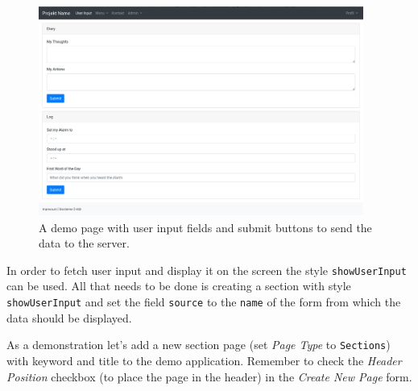 \documentclass[a4paper,oneside]{book}
\begin{document}
\begin{figure}[ht]
    \centering
    \includegraphics[width=0.95\textwidth]{form_empty.png}
    \caption{A demo page with user input fields and submit buttons to send the data to the server.}
    \label{fig.form-empty}
\end{figure}

In order to fetch user input and display it on the screen the style \texttt{showUserInput} can be used.
All that needs to be done is creating a section with style \texttt{showUserInput} and set the field \texttt{source} to the \texttt{name} of the form from which the data should be displayed.

As a demonstration let's add a new section page (set \emph{Page Type} to \texttt{Sections}) with keyword  and title  to the demo application.
Remember to check the \emph{Header Position} checkbox (to place the page in the header) in the \emph{Create New Page} form.
\end{document}
